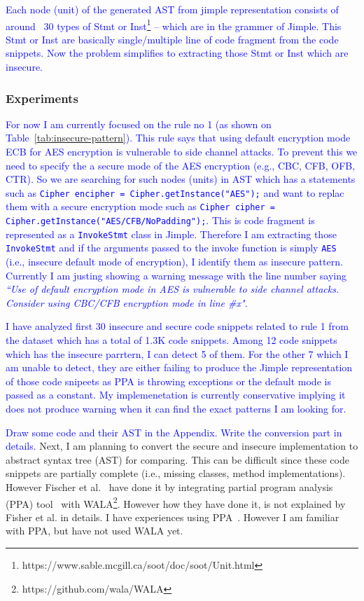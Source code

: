 \documentclass[sigconf]{acmart}
\begin{document}
\textcolor{blue}{
Each node (unit) of the generated AST from jimple representation consists of  around ~30 types of Stmt or Inst\footnote{https://www.sable.mcgill.ca/soot/doc/soot/Unit.html} -- which are in the grammer of Jimple. This Stmt or Inst are basically single/multiple line of code fragment from the code snippets. Now the problem simplifies to extracting those Stmt or Inst which are insecure.}

\subsubsection{Experiments}

\textcolor{blue}{For now I am currently focused on the rule no 1 (as shown on Table~\ref{tab:insecure-pattern}). This rule says that using default encryption mode ECB for AES encryption is vulnerable to side channel attacks. To prevent this we need to specify the a secure mode of the AES encryption (e.g., CBC, CFB, OFB, CTR). So we are searching for such nodes (units) in AST which has a statements such as \texttt{Cipher encipher = Cipher.getInstance("AES");} and want to replac them with a secure encryption mode such as \texttt{Cipher cipher = Cipher.getInstance("AES/CFB/NoPadding");}. This is code fragment is represented as a \texttt{InvokeStmt} class in Jimple. Therefore I am extracting those \texttt{InvokeStmt} and if the arguments passed to the invoke function is simply \texttt{AES} (i.e., insecure default mode of encryption), I identify them as insecure pattern. Currently I am justing showing a warning message with the line number saying 
\textit{``Use of default encryption mode in AES is vulnerable to side channel attacks. Consider using CBC/CFB encryption mode in line \#x".}}


\textcolor {blue}{I have analyzed first 30 insecure and secure code snippets related to rule 1 from the dataset which has a total of 1.3K code snippets. Among 12 code snippets which has the insecure parrtern, I can detect 5 of them. For the other 7 which I am unable to detect, they are either failing to produce the Jimple representation of those code snipeets as PPA is throwing exceptions or the default mode is passed as a constant. My implemenetation is currently conservative implying it does not produce warning when it can find the exact patterns I am looking for.}


\iffalse
\textcolor{blue}{
  Draw some code and their AST in the Appendix. Write the conversion part in details.
}
Next, I am planning to convert the secure and insecure implementation to abstract syntax tree (AST) for comparing. This can be difficult since these code snippets are partially complete (i.e., missing classes, method implementations). However Fischer et al.~\cite{fischer2017stack} have done it by integrating partial program analysis (PPA) tool~\cite{dagenais2008enabling} with WALA\footnote{https://github.com/wala/WALA}. However how they have done it, is not explained by Fisher et al. in details. I have experiences using PPA~\cite{dagenais2008enabling}. However I am familiar with PPA, but have not used WALA yet. %
\end{document}
